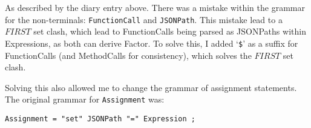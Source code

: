 As described by the diary entry above. There was a mistake within the grammar for the non-terminals: \verb|FunctionCall| and \verb|JSONPath|. This mistake lead to a $FIRST$ set clash, which lead to FunctionCalls being parsed as JSONPaths within Expressions, as both can derive Factor. To solve this, I added `\verb|$|' as a suffix for FunctionCalls (and MethodCalls for consistency), which solves the $FIRST$ set clash.

Solving this also allowed me to change the grammar of assignment statements. The original grammar for \verb|Assignment| was:

\begin{verbatim}
Assignment = "set" JSONPath "=" Expression ;
\end{verbatim}

